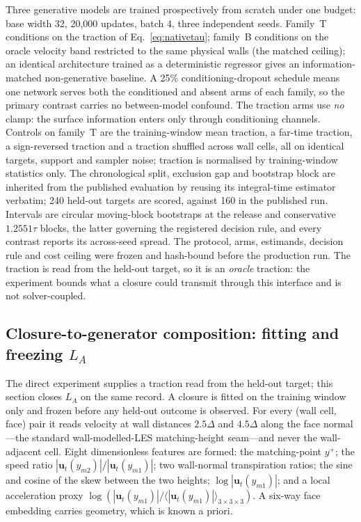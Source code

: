 Three generative models are trained prospectively from scratch under one budget: base width 32,
20,000 updates, batch 4, three independent seeds. Family~T conditions on the traction of
Eq.~\eqref{eq:nativetau}; family~B conditions on the oracle velocity band restricted to the same
physical walls (the matched ceiling); an identical architecture trained as a deterministic
regressor gives an information-matched non-generative baseline. A 25\% conditioning-dropout
schedule means one network serves both the conditioned and absent arms of each family, so the
primary contrast carries no between-model confound. The traction arms use \emph{no} clamp: the
surface information enters only through conditioning channels. Controls on family~T are the
training-window mean traction, a far-time traction, a sign-reversed traction and a traction
shuffled across wall cells, all on identical targets, support and sampler noise; traction is
normalised by training-window statistics only. The chronological split, exclusion gap and
bootstrap block are inherited from the published evaluation by reusing its integral-time estimator
verbatim; 240 held-out targets are scored, against 160 in the published run. Intervals are
circular moving-block bootstraps at the release and conservative $1.2551\tau$ blocks, the latter
governing the registered decision rule, and every contrast reports its across-seed spread. The
protocol, arms, estimands, decision rule and cost ceiling were frozen and hash-bound before the
production run. The traction is read from the held-out target, so it is an
\emph{oracle} traction: the experiment bounds what a closure could transmit through this interface
and is not solver-coupled.

\subsection{Closure-to-generator composition: fitting and freezing $L_A$}
\label{sec:closuremethodfit}

The direct experiment supplies a traction read from the held-out target; this section closes
$L_A$ on the same record. A closure is fitted on the training window only and frozen before any
held-out outcome is observed. For every (wall cell, face) pair it reads velocity at wall distances
$2.5\Delta$ and $4.5\Delta$ along the face normal---the standard wall-modelled-LES matching-height
seam---and never the wall-adjacent cell. Eight dimensionless features are formed: the matching-point $y^+$;
the speed ratio $|\mathbf u_t(y_{m2})|/|\mathbf u_t(y_{m1})|$; two wall-normal transpiration
ratios; the sine and cosine of the skew between the two heights; $\log|\mathbf u_t(y_{m1})|$; and
a local acceleration proxy
$\log(|\mathbf u_t(y_{m1})|/\langle|\mathbf u_t(y_{m1})|\rangle_{3\times3\times3})$. A six-way
face embedding carries geometry, which is known a priori.

